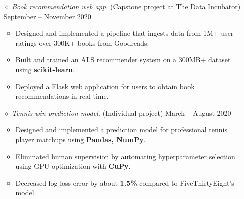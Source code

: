 \documentclass{simplecv}
\begin{document}
\begin{itemize}
  \item[$\diamond$] {\it Book recommendation web app.} (Capstone project at The Data Incubator) \hfill September -- November 2020
  \begin{itemize}
    \itemsep0em
    \item Designed and implemented a pipeline that ingests data from 1M+ user ratings over 300K+ books from Goodreads.
    \item Built and trained an ALS recommender system on a 300MB+ dataset using {\bf scikit-learn}.
    \item Deployed a Flask web application for users to obtain book recommendations in real time.
  \end{itemize}

  \item[$\diamond$] {\it Tennis win prediction model.} (Individual project) \hfill March -- August 2020 %
  \begin{itemize}
    \itemsep0em
    \item Designed and implemented a prediction model for professional tennis player matchups using {\bf Pandas, NumPy}.
    \item Eliminated human supervision by automating hyperparameter selection using GPU optimization with {\bf CuPy}.
    \item Decreased log-loss error by about {\bf 1.5\%} compared to FiveThirtyEight's model.
  \end{itemize}


\end{itemize}
\end{document}

